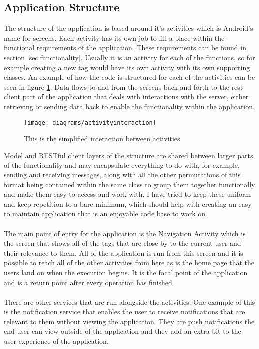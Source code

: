 \subsection{Application Structure}
\label{sec:android_application_structure}

The structure of the application is based around it's activities which is Android's name for screens. Each activity has its own job to fill a place within the functional requirements of the application. These requirements can be found in section \ref{sec:functionality}. Usually it is an activity for each of the functions, so for example creating a new tag would have its own activity with its own supporting classes. An example of how the code is structured for each of the activities can be seen in figure \ref{fig:activity_interation_image}. Data flows to and from the screens back and forth to the rest client part of the application that deals with interactions with the server, either retrieving or sending data back to enable the functionality within the application.\\

\begin{figure}[H]
    \centering
    \texttt{[image: diagrams/activityinteraction]}
    \caption{This is the simplified interaction between activities}
    \label{fig:activity_interation_image}
\end{figure} 

\noindent
Model and RESTful client layers of the structure are shared between larger parts of the functionality and may encapsulate everything to do with, for example, sending and receiving messages, along with all the other permutations of this format being contained within the same class to group them together functionally and make them easy to access and work with. I have tried to keep these uniform and keep repetition to a bare minimum, which should help with creating an easy to maintain application that is an enjoyable code base to work on.\\
\\
The main point of entry for the application is the Navigation Activity which is the screen that shows all of the tags that are close by to the current user and their relevance to them. All of the application is run from this screen and it is possible to reach all of the other activities from here as is the home page that the users land on when the execution begins. It is the focal point of the application and is a return point after every operation has finished.\\
\\
There are other services that are run alongside the activities. One example of this is the notification service that enables the user to receive notifications that are relevant to them without viewing the application. They are push notifications the end user can view outside of the application and they add an extra bit to the user experience of the application.

